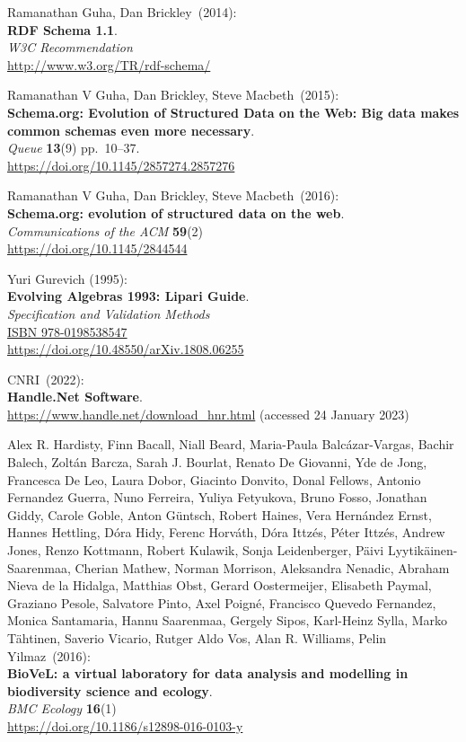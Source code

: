 \begin{thebibliography}{9}
Ramanathan Guha, Dan Brickley~(2014): \\
\textbf{RDF Schema 1.1}.\\
\emph{W3C Recommendation} \\
\url{http://www.w3.org/TR/rdf-schema/}

Ramanathan V Guha, Dan Brickley, Steve Macbeth~(2015): \\
\textbf{Schema.org: Evolution of Structured Data on the Web: Big data
makes common schemas even more necessary}.\\
\emph{Queue} \textbf{13}(9) pp.~10--37.\\
\url{https://doi.org/10.1145/2857274.2857276}

Ramanathan V Guha, Dan Brickley, Steve Macbeth~(2016): \\
\textbf{Schema.org: evolution of structured data on the web}.\\
\emph{Communications of the ACM} \textbf{59}(2)\\
\url{https://doi.org/10.1145/2844544}

Yuri Gurevich (1995):\\
\textbf{Evolving Algebras 1993: Lipari Guide}.\\
\emph{Specification and Validation Methods} \\
\href{https://identifiers.org/isbn/9780198538547}{ISBN 978-0198538547} \\
\url{https://doi.org/10.48550/arXiv.1808.06255}

CNRI~(2022): \\
\textbf{Handle.Net Software}. \\
\url{https://www.handle.net/download_hnr.html} (accessed 24 January
2023)

Alex R. Hardisty, Finn Bacall, Niall Beard, Maria-Paula Balcázar-Vargas, Bachir Balech, Zoltán Barcza, Sarah J. Bourlat, Renato De Giovanni, Yde de Jong, Francesca De Leo, Laura Dobor, Giacinto Donvito, Donal Fellows, Antonio Fernandez Guerra, Nuno Ferreira, Yuliya Fetyukova, Bruno Fosso, Jonathan Giddy, Carole Goble, Anton Güntsch, Robert Haines, Vera Hernández Ernst, Hannes Hettling, Dóra Hidy, Ferenc Horváth, Dóra Ittzés, Péter Ittzés, Andrew Jones, Renzo Kottmann, Robert Kulawik, Sonja Leidenberger, Päivi Lyytikäinen-Saarenmaa, Cherian Mathew, Norman Morrison, Aleksandra Nenadic, Abraham Nieva de la Hidalga, Matthias Obst, Gerard Oostermeijer, Elisabeth Paymal, Graziano Pesole, Salvatore Pinto, Axel Poigné, Francisco Quevedo Fernandez, Monica Santamaria, Hannu Saarenmaa, Gergely Sipos, Karl-Heinz Sylla, Marko Tähtinen, Saverio Vicario, Rutger Aldo Vos, Alan R. Williams, Pelin Yilmaz~(2016): \\
\textbf{BioVeL: a virtual laboratory for data analysis and modelling in biodiversity science and ecology}.\\
\emph{BMC Ecology} \textbf{16}(1)\\
\url{https://doi.org/10.1186/s12898-016-0103-y}


\end{thebibliography}
